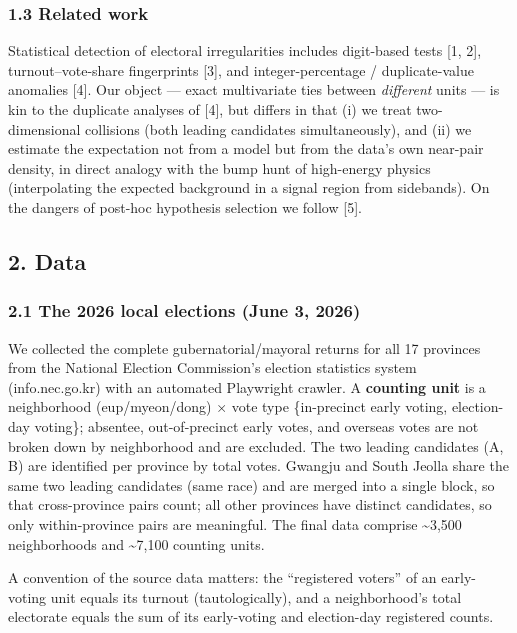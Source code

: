 \documentclass[
  11pt,
]{article}
\begin{document}
\subsubsection{1.3 Related work}\label{related-work}

Statistical detection of electoral irregularities includes digit-based
tests {[}1, 2{]}, turnout--vote-share fingerprints {[}3{]}, and
integer-percentage / duplicate-value anomalies {[}4{]}. Our object ---
exact multivariate ties between \emph{different} units --- is kin to the
duplicate analyses of {[}4{]}, but differs in that (i) we treat
two-dimensional collisions (both leading candidates simultaneously), and
(ii) we estimate the expectation not from a model but from the data's
own near-pair density, in direct analogy with the bump hunt of
high-energy physics (interpolating the expected background in a signal
region from sidebands). On the dangers of post-hoc hypothesis selection
we follow {[}5{]}.

\subsection{2. Data}\label{data}

\subsubsection{2.1 The 2026 local elections (June 3,
2026)}\label{the-2026-local-elections-june-3-2026}

We collected the complete gubernatorial/mayoral returns for all 17
provinces from the National Election Commission's election statistics
system (info.nec.go.kr) with an automated Playwright crawler. A
\textbf{counting unit} is a neighborhood (eup/myeon/dong) × vote type
\{in-precinct early voting, election-day voting\}; absentee,
out-of-precinct early votes, and overseas votes are not broken down by
neighborhood and are excluded. The two leading candidates (A, B) are
identified per province by total votes. Gwangju and South Jeolla share
the same two leading candidates (same race) and are merged into a single
block, so that cross-province pairs count; all other provinces have
distinct candidates, so only within-province pairs are meaningful. The
final data comprise \textasciitilde3,500 neighborhoods and
\textasciitilde7,100 counting units.

A convention of the source data matters: the ``registered voters'' of an
early-voting unit equals its turnout (tautologically), and a
neighborhood's total electorate equals the sum of its early-voting and
election-day registered counts.
\end{document}
